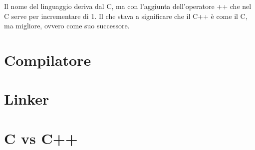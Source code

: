 \textsf{Il nome del linguaggio deriva dal C, ma con l'aggiunta dell'operatore ++ che nel C serve per incrementare di 1. Il che stava a significare che il C++ è come il C, ma migliore, ovvero come suo successore.}\\


\section{Compilatore}

\textsf{\small }



\section{Linker}

\textsf{\small }



\section{C vs C++}

